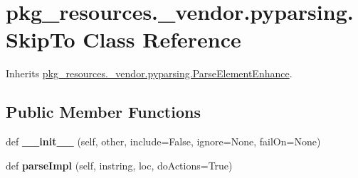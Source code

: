 \hypertarget{classpkg__resources_1_1__vendor_1_1pyparsing_1_1_skip_to}{}\section{pkg\+\_\+resources.\+\_\+vendor.\+pyparsing.\+Skip\+To Class Reference}
\label{classpkg__resources_1_1__vendor_1_1pyparsing_1_1_skip_to}


Inherits \hyperlink{classpkg__resources_1_1__vendor_1_1pyparsing_1_1_parse_element_enhance}{pkg\+\_\+resources.\+\_\+vendor.\+pyparsing.\+Parse\+Element\+Enhance}.

\subsection*{Public Member Functions}
\begin{DoxyCompactItemize}
\item 
\mbox{\label{classpkg__resources_1_1__vendor_1_1pyparsing_1_1_skip_to_abd30b2c32b599407621f2114b6ba1c14}} 
def {\bfseries \+\_\+\+\_\+init\+\_\+\+\_\+} (self, other, include=False, ignore=None, fail\+On=None)
\item 
\mbox{\label{classpkg__resources_1_1__vendor_1_1pyparsing_1_1_skip_to_af67786e5f860dd91924d312432d43af3}} 
def {\bfseries parse\+Impl} (self, instring, loc, do\+Actions=True)
\end{DoxyCompactItemize}
